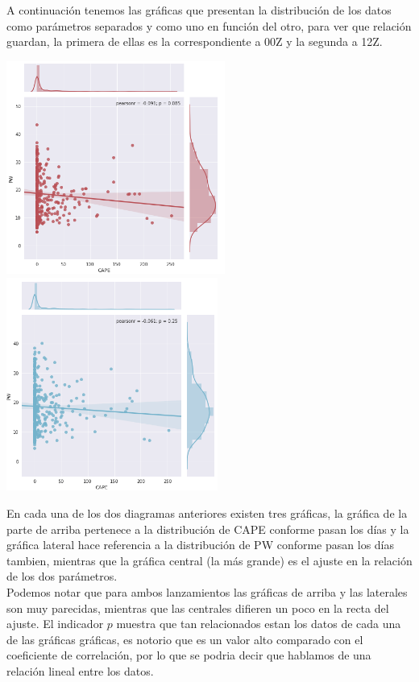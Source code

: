 \documentclass[12pt]{article}
\begin{document}
A continuación tenemos las gráficas que presentan la distribución de los datos como parámetros separados y como uno en función del otro, para ver que relación guardan, la primera de ellas es la correspondiente a 00Z y la segunda a 12Z.
\begin{center}
	\includegraphics[height=7cm]{0111.png} \hspace*{\fill}
    \includegraphics[height=7cm]{0222.png}
\end{center}
En cada una de los dos diagramas anteriores existen tres gráficas, la gráfica de la parte de arriba pertenece a la distribución de CAPE conforme pasan los días y la gráfica lateral hace referencia a la distribución de PW conforme pasan los días tambien, mientras que la gráfica central (la más grande) es el ajuste en la relación de los dos parámetros.\\

Podemos notar que para ambos lanzamientos las gráficas de arriba y las laterales son muy parecidas, mientras que las centrales difieren un poco en la recta del ajuste. El indicador $p$ muestra que tan relacionados estan los datos de cada una de las gráficas gráficas, es notorio que es un valor alto comparado con el coeficiente de correlación, por lo que se podria decir que hablamos de una relación lineal entre los datos.\\
\end{document}
